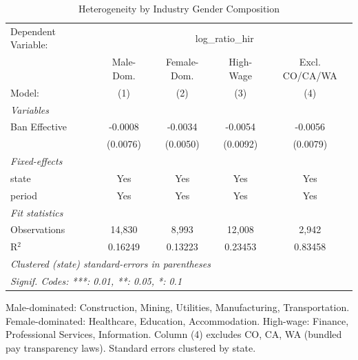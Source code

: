 
\begin{table}[htbp]
   \caption{\label{tab:heterogeneity} Heterogeneity by Industry Gender Composition}
   \centering
   \begin{tabular}{lcccc}
      \tabularnewline \midrule \midrule
      Dependent Variable: & \multicolumn{4}{c}{log\_ratio\_hir}\\
                    & Male-Dom. & Female-Dom. & High-Wage & Excl. CO/CA/WA \\   
      Model:        & (1)       & (2)         & (3)       & (4)\\  
      \midrule
      \emph{Variables}\\
      Ban Effective & -0.0008   & -0.0034     & -0.0054   & -0.0056\\   
                    & (0.0076)  & (0.0050)    & (0.0092)  & (0.0079)\\   
      \midrule
      \emph{Fixed-effects}\\
      state         & Yes       & Yes         & Yes       & Yes\\  
      period        & Yes       & Yes         & Yes       & Yes\\  
      \midrule
      \emph{Fit statistics}\\
      Observations  & 14,830    & 8,993       & 12,008    & 2,942\\  
      R$^2$         & 0.16249   & 0.13223     & 0.23453   & 0.83458\\  
      \midrule \midrule
      \multicolumn{5}{l}{\emph{Clustered (state) standard-errors in parentheses}}\\
      \multicolumn{5}{l}{\emph{Signif. Codes: ***: 0.01, **: 0.05, *: 0.1}}\\
   \end{tabular}
   
   \par \raggedright 
   Male-dominated: Construction, Mining, Utilities, Manufacturing, Transportation. Female-dominated: Healthcare, Education, Accommodation. High-wage: Finance, Professional Services, Information. Column (4) excludes CO, CA, WA (bundled pay transparency laws). Standard errors clustered by state.
\end{table}


